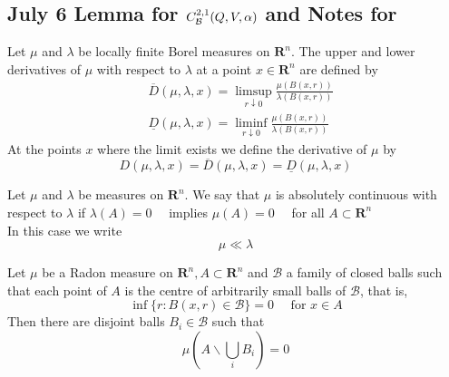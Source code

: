 \newpage
\subsection{July 6 Lemma for \texorpdfstring{$C^{2,1}_\mathcal B(Q, V, \alpha)$}{Lg} and Notes for \texorpdfstring{\cite{mattila1999geometry}}{Lg}}

\begin{definition}[Derivative of $\mu$]
    Let $\mu$ and $\lambda$ be locally finite Borel measures on $\mathbf{R}^{n}$. The upper and lower derivatives of $\mu$ with respect to $\lambda$ at a point $x \in \mathbf{R}^{n}$ are defined by
$$
\begin{aligned}
&\overline{D}(\mu, \lambda, x)=\limsup _{r \downarrow 0} \frac{\mu(B(x, r))}{\lambda(B(x, r))} \\
&\underline{D}(\mu, \lambda, x)=\liminf _{r \downarrow 0} \frac{\mu(B(x, r))}{\lambda(B(x, r))}
\end{aligned}
$$
At the points $x$ where the limit exists we define the derivative of $\mu$ by
$$
D(\mu, \lambda, x)=\overline{D}(\mu, \lambda, x)=\underline{D}(\mu, \lambda, x)
$$
\end{definition}

\begin{definition}
    Let $\mu$ and $\lambda$ be measures on $\mathbf{R}^{n} .$ We say that $\mu$ is absolutely continuous with respect to $\lambda$ if
$\lambda(A)=0 \quad$ implies $\mu(A)=0 \quad$ for all $A \subset \mathbf{R}^{n}$\\
In this case we write
$$
\mu \ll \lambda
$$
\end{definition}


\begin{theorem}
    Let $\mu$ be a Radon measure on $\mathbf{R}^{n}, A \subset \mathbf{R}^{n}$ and $\mathcal{B}$ a family of closed balls such that each point of $A$ is the centre of arbitrarily small balls of $\mathcal{B}$, that is,
    $$
    \inf \{r: B(x, r) \in \mathcal{B}\}=0 \quad \text { for } x \in A
    $$
    Then there are disjoint balls $B_{i} \in \mathcal{B}$ such that
    $$
    \mu\left(A \backslash \bigcup_{i} B_{i}\right)=0
    $$    
\end{theorem}



